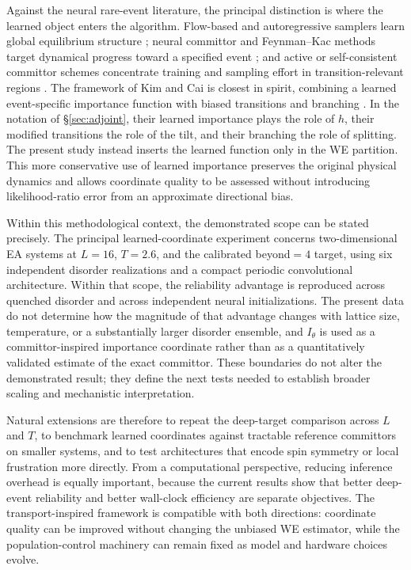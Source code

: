 \documentclass[a4paper,fleqn]{cas-sc}
\begin{document}
Against the neural rare-event literature, the principal distinction is where the learned object
enters the algorithm. Flow-based and autoregressive samplers learn global equilibrium structure
\citep{wu2019,noe2019,nicoli2020,gabrie2022}; neural committor and Feynman--Kac methods target
dynamical progress toward a specified event \citep{khoo2019,li2022,strahan2023}; and active or
self-consistent committor schemes concentrate training and sampling effort in transition-relevant
regions \citep{rotskoff2022,kang2024,trizio2025}. The framework of Kim and Cai is closest in
spirit, combining a learned event-specific importance function with biased transitions and
branching \citep{kimcai2026}. In the notation of \S\ref{sec:adjoint}, their learned importance
plays the role of $h$, their modified transitions the role of the tilt, and their branching the
role of splitting. The present study instead inserts the learned function only in the WE
partition. This more conservative use of learned importance preserves the original physical
dynamics and allows coordinate quality to be assessed without introducing likelihood-ratio
error from an approximate directional bias.

Within this methodological context, the demonstrated scope can be stated precisely.\label{sec:scope}
The principal learned-coordinate experiment concerns two-dimensional EA systems at $L=16$,
$T=2.6$, and the calibrated beyond$=4$ target, using six independent disorder realizations and
a compact periodic convolutional architecture. Within that scope, the reliability advantage is
reproduced across quenched disorder and across independent neural initializations. The present
data do not determine how the magnitude of that advantage changes with lattice size,
temperature, or a substantially larger disorder ensemble, and $I_\theta$ is used as a
committor-inspired importance coordinate rather than as a quantitatively validated estimate of
the exact committor. These boundaries do not alter the demonstrated result; they define the
next tests needed to establish broader scaling and mechanistic interpretation.

Natural extensions are therefore to repeat the deep-target comparison across $L$ and $T$, to
benchmark learned coordinates against tractable reference committors on smaller systems, and to
test architectures that encode spin symmetry or local frustration more directly. From a
computational perspective, reducing inference overhead is equally important, because the
current results show that better deep-event reliability and better wall-clock efficiency are
separate objectives. The transport-inspired framework is compatible with both directions:
coordinate quality can be improved without changing the unbiased WE estimator, while the
population-control machinery can remain fixed as model and hardware choices evolve.
\end{document}
